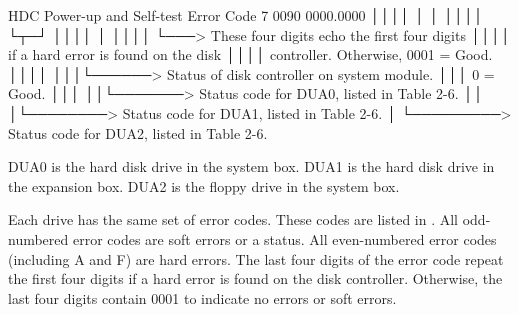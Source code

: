 \begin{ttfig}{HDC Power-up and Self-test Error Code}
7 0090 0000.0000
       ││││ │  │
       ││││ └┬─┘
       ││││  │
       ││││  └───> These four digits echo the first four digits
       ││││        if a hard error is found on the disk
       ││││        controller. Otherwise, 0001 = Good.
       ││││
       │││└──────> Status of disk controller on system module.
       │││         0 = Good.
       │││
       ││└───────> Status code for DUA0, listed in Table 2-6.
       ││
       │└────────> Status code for DUA1, listed in Table 2-6.
       │
       └─────────> Status code for DUA2, listed in Table 2-6.

              DUA0 is the hard disk drive in the system box.
              DUA1 is the hard disk drive in the expansion box.
              DUA2 is the floppy drive in the system box.
\end{ttfig}

Each drive has the same set of error codes. These codes are listed in 
. All odd-numbered error codes are soft errors or a status. All 
even-numbered error codes (including A and F) are hard errors. The last four
digits of the error code repeat the first four digits if a hard error is found on
the disk controller. Otherwise, the last four digits contain 0001 to indicate
no errors or soft errors.

